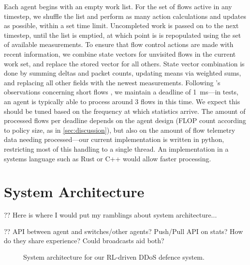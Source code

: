 \documentclass[10pt, times, conference, letterpaper]{IEEEtran}
\begin{document}
Each agent begins with an empty work list.
For the set of flows active in any timestep, we shuffle the list and perform as many action calculations and updates as possible, within a set time limit.
Uncompleted work is passed on to the next timestep, until the list is emptied, at which point is is repopulated using the set of available measurements.
To ensure that flow control actions are made with recent information, we combine state vectors for unvisited flows in the current work set, and replace the stored vector for all others.
State vector combination is done by summing deltas and packet counts, updating means via weighted sums, and replacing all other fields with the newest measurements.
Following \citeauthor{DBLP:conf/sigcomm/ChenL0L18}'s observations concerning short flows \cite{DBLP:conf/sigcomm/ChenL0L18}, we maintain a deadline of \SI{1}{\milli\second}---in tests, an agent is typically able to process around 3 flows in this time.
We expect this should be tuned based on the frequency at which statistics arrive.
The amount of processed flows per deadline depends on the agent design (FLOP count according to policy size, as in \cref{sec:discussion}), but also on the amount of flow telemetry data needing processed---our current implementation is written in python, restricting most of this handling to a single thread.
An implementation in a systems language such as Rust or C++ would allow faster processing.

\section{System Architecture}\label{sec:system-architecture}

?? Here is where I would put my ramblings about system architecture...

?? API between agent and switches/other agents? Push/Pull API on stats? How do they share experience? Could broadcasts aid both?

\begin{figure}
	\centering
	\caption{System architecture  for our RL-driven DDoS defence system.}
\end{figure}
\end{document}
